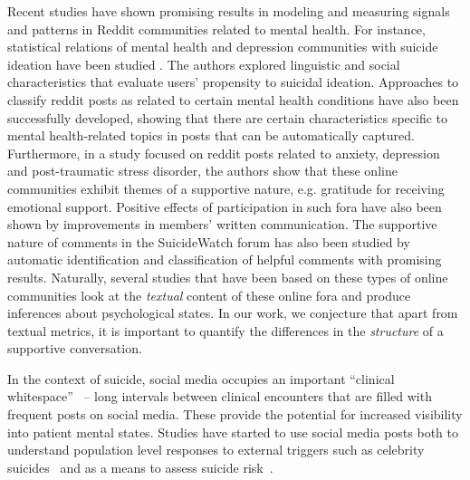 Recent studies have shown promising results in modeling and measuring signals and patterns in Reddit communities related to mental health. For instance, statistical relations of mental health and depression communities with suicide ideation have been studied \cite{DeChoudhury2014,DeChoudhury2016}. The authors explored linguistic and social characteristics that evaluate users' propensity to suicidal ideation. Approaches to classify reddit posts as related to certain mental health conditions have also been successfully developed, showing that there are certain characteristics specific to mental health-related topics in posts that can be automatically captured\cite{gkotsis2017characterisation}. Furthermore, in a study focused on reddit posts related to anxiety, depression and post-traumatic stress disorder, the authors show that these online communities exhibit themes of a supportive nature, e.g. gratitude for receiving emotional support\cite{park2018examining}. Positive effects of  participation in such fora have also been shown by improvements in members' written communication\cite{info:doi/10.2196/jmir.8219}. The supportive nature of comments in the SuicideWatch forum has also been studied by automatic identification and classification of helpful comments with promising results\cite{Kavuluru:2016:CHC:2975167.2975170}.
Naturally, several studies that have been based on these types of online communities 
look at the \emph{textual} content of these online fora and produce inferences about psychological states. In our work, we conjecture that apart from textual metrics, it is important to quantify the differences in the \emph{structure} of a supportive conversation.



In the context of suicide, social media occupies an important ``clinical whitespace''~\cite{coppersmith2018} --  long intervals between clinical encounters that are filled with frequent posts on social media. These provide the potential for increased visibility into patient mental states. Studies have started to use social media posts both to understand population level responses to external triggers such as celebrity suicides~\cite{kumardetecting,karamshuk} and as a means to assess suicide risk~\cite{shing2018,clpsych}.   

